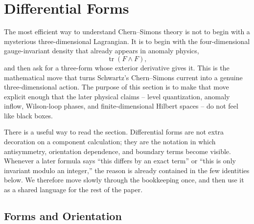 
\providecommand{\dd}{\mathrm{d}}
\providecommand{\Tr}{\operatorname{Tr}}
\providecommand{\tr}{\operatorname{tr}}
\providecommand{\CS}{\operatorname{CS}}
\providecommand{\Hom}{\operatorname{Hom}}
\providecommand{\Lie}{\operatorname{Lie}}
\providecommand{\id}{\operatorname{id}}

\section{Differential Forms}
\label{sec:forms-cs-foundations}

The most efficient way to understand Chern--Simons theory is not to begin with a mysterious three-dimensional Lagrangian. It is to begin with the four-dimensional gauge-invariant density that already appears in anomaly physics,
\begin{equation}
  \tr(F\wedge F),
\end{equation}
and then ask for a three-form whose exterior derivative gives it. This is the mathematical move that turns Schwartz's Chern--Simons current into a genuine three-dimensional action. The purpose of this section is to make that move explicit enough that the later physical claims -- level quantization, anomaly inflow, Wilson-loop phases, and finite-dimensional Hilbert spaces -- do not feel like black boxes.

There is a useful way to read the section. Differential forms are not extra decoration on a component calculation; they are the notation in which antisymmetry, orientation dependence, and boundary terms become visible. Whenever a later formula says ``this differs by an exact term'' or ``this is only invariant modulo an integer,'' the reason is already contained in the few identities below. We therefore move slowly through the bookkeeping once, and then use it as a shared language for the rest of the paper.


\subsection{Forms and Orientation}
\label{subsec:forms-toolkit}

